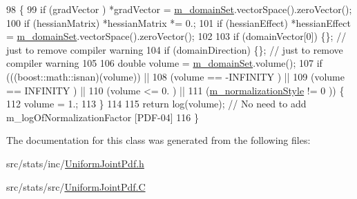 \begin{DoxyCode}
98 \{
99   \textcolor{keywordflow}{if} (gradVector   ) *gradVector     = \hyperlink{class_q_u_e_s_o_1_1_base_scalar_function_a67696e86211197938c72cd11863f5cf8}{m\_domainSet}.vectorSpace().zeroVector();
100   \textcolor{keywordflow}{if} (hessianMatrix) *hessianMatrix *= 0.;
101   \textcolor{keywordflow}{if} (hessianEffect) *hessianEffect  = \hyperlink{class_q_u_e_s_o_1_1_base_scalar_function_a67696e86211197938c72cd11863f5cf8}{m\_domainSet}.vectorSpace().zeroVector();
102 
103   \textcolor{keywordflow}{if} (domainVector[0]) \{\}; \textcolor{comment}{// just to remove compiler warning}
104   \textcolor{keywordflow}{if} (domainDirection) \{\}; \textcolor{comment}{// just to remove compiler warning}
105 
106   \textcolor{keywordtype}{double} volume = \hyperlink{class_q_u_e_s_o_1_1_base_scalar_function_a67696e86211197938c72cd11863f5cf8}{m\_domainSet}.volume();
107   \textcolor{keywordflow}{if} (((boost::math::isnan)(volume)) ||
108       (volume == -INFINITY         ) ||
109       (volume ==  INFINITY         ) ||
110       (volume <= 0.                ) ||
111       (\hyperlink{class_q_u_e_s_o_1_1_base_joint_pdf_a138c99bcef7a67077d9612bddfdcb896}{m\_normalizationStyle} != 0   )) \{
112     volume = 1.;
113   \}
114 
115   \textcolor{keywordflow}{return} log(volume); \textcolor{comment}{// No need to add m\_logOfNormalizationFactor [PDF-04]}
116 \}
\end{DoxyCode}


The documentation for this class was generated from the following files\-:\begin{DoxyCompactItemize}
\item 
src/stats/inc/\hyperlink{_uniform_joint_pdf_8h}{Uniform\-Joint\-Pdf.\-h}\item 
src/stats/src/\hyperlink{_uniform_joint_pdf_8_c}{Uniform\-Joint\-Pdf.\-C}\end{DoxyCompactItemize}
